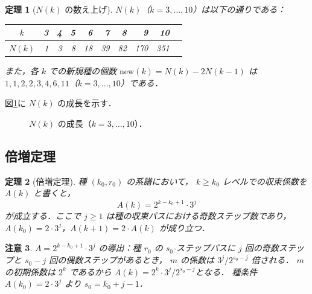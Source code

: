 \documentclass[twocolumn,a4paper,10pt]{jsarticle}
\newtheorem{theorem}{定理}[section]
\newtheorem{remark}[theorem]{注意}
\begin{document}
\begin{theorem}[$N(k)$ の数え上げ]\label{thm:Nk}
$N(k)$（$k = 3, \ldots, 10$）は以下の通りである：
\begin{center}
\small
\begin{tabular}{crrrrrrrrr}
\toprule
$k$    & 3 & 4 & 5 & 6  & 7  & 8  & 9  & 10  \\
\midrule
$N(k)$ & 1 & 3 & 8 & 18 & 39 & 82 & 170 & 351 \\
\bottomrule
\end{tabular}
\end{center}
また，各 $k$ での新規種の個数
$\mathrm{new}(k) = N(k) - 2 N(k-1)$ は
$1, 1, 2, 2, 3, 4, 6, 11$（$k = 3, \ldots, 10$）である．
\end{theorem}

図\ref{fig:Nk}に $N(k)$ の成長を示す．

\begin{figure}[h]
\centering
{}
\caption{$N(k)$ の成長（$k=3,\ldots,10$）．}
\label{fig:Nk}
\end{figure}

\subsection{倍増定理}

\begin{theorem}[倍増定理]\label{thm:doubling}
種 $(k_0, r_0)$ の系譜において，
$k \geq k_0$ レベルでの収束係数を $A(k)$ と書くと，
\[
  A(k) = 2^{k - k_0 + 1} \cdot 3^j
\]
が成立する．ここで $j \geq 1$ は種の収束パスにおける奇数ステップ数であり，
$A(k_0) = 2 \cdot 3^j$，$A(k+1) = 2 \cdot A(k)$ が成り立つ．
\end{theorem}

\begin{remark}
$A = 2^{k-k_0+1}\cdot 3^j$ の導出：種 $r_0$ の $s_0$-ステップパスに
$j$ 回の奇数ステップと $s_0-j$ 回の偶数ステップがあるとき，
$m$ の係数は $3^j/2^{s_0-j}$ 倍される．
$m$ の初期係数は $2^k$ であるから
$A(k) = 2^k \cdot 3^j / 2^{s_0-j}$となる．
種条件 $A(k_0)=2\cdot 3^j$ より $s_0 = k_0 + j - 1$．
\end{remark}
\end{document}
